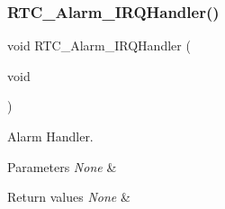 \subsubsection{\texorpdfstring{R\+T\+C\+\_\+\+Alarm\+\_\+\+I\+R\+Q\+Handler()}{RTC\_Alarm\_IRQHandler()}}
{\footnotesize\ttfamily void R\+T\+C\+\_\+\+Alarm\+\_\+\+I\+R\+Q\+Handler (\begin{DoxyParamCaption}\item[{void}]{ }\end{DoxyParamCaption})}



Alarm Handler. 


\begin{DoxyParams}{Parameters}
{\em None} & \\
\hline
\end{DoxyParams}

\begin{DoxyRetVals}{Return values}
{\em None} & \\
\hline
\end{DoxyRetVals}
